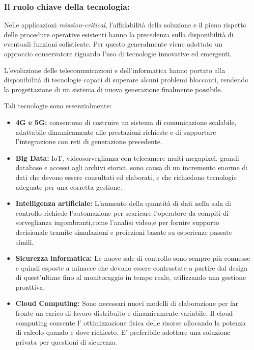 \subsubsection{Il ruolo chiave della tecnologia:}
Nelle applicazioni \emph{mission-critical}, l'affidabilità
della soluzione e il pieno rispetto delle 
procedure operative esistenti hanno la precedenza
sulla disponibilità di eventuali funzioni sofisticate. 
Per questo generalmente viene adottato un approccio conservatore
 riguardo l'uso di tecnologie innovative ed emergenti.

L'evoluzione delle telecomunicazioni e dell'informatica 
hanno portato alla disponibilità di tecnologie capaci
di superare alcuni problemi bloccanti, rendendo la
progettazione di un sistema di nuova generazione finalmente possibile.

Tali tecnologie sono essenzialmente:

\begin{itemize}
    \item \textbf{4G e 5G:} consentono di costruire un sistema di comunicazione scalabile,
    adattabile dinamicamente alle prestazioni richieste e di supportare l'integrazione con
    reti di generazione precedente.
    \item \textbf{Big Data:} IoT, videosorveglianza con telecamere multi megapixel,
    grandi database e accessi agli archivi storici, sono causa di un incremento enorme di 
    dati che devono essere consultati ed elaborati, e che richiedono
    tecnologie adeguate per una corretta gestione.
    \item \textbf{Intelligenza artificiale:} L'aumento della quantità di dati nella sala di 
    controllo richiede l'automazione per scaricare l'operatore da compiti di sorveglianza 
    ingombranti,come l'analisi video,e per fornire supporto decisionale tramite simulazioni
     e proiezioni basate su esperienze passate simili.
    \item \textbf{Sicurezza informatica:} Le nuove sale di controllo
    sono sempre più connesse e quindi esposte a minacce che devono essere contrastate a partire 
    dal design di quest'ultime fino al monitoraggio in tempo reale, utilizzando una gestione proattiva. 
    \item \textbf{Cloud Computing:} Sono necessari nuovi modelli di elaborazione per far fronte
    un carico di lavoro distribuito e dinamicamente variabile. Il cloud computing consente l' ottimizzazione fisica
    delle risorse allocando la potenza di calcolo quando e dove richiesto.
     E' preferibile adottare una soluzione privata per questioni di sicurezza.

\end{itemize}



